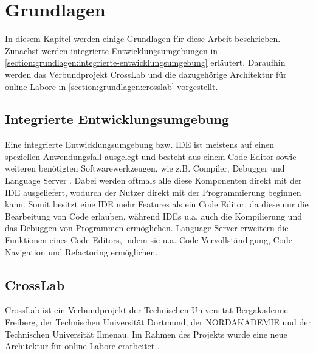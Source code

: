\chapter{Grundlagen}\label{section:grundlagen}

In diesem Kapitel werden einige Grundlagen für diese Arbeit beschrieben. Zunächst werden integrierte Entwicklungsumgebungen in \autoref{section:grundlagen:integrierte-entwicklungsumgebung} erläutert. Daraufhin werden das Verbundprojekt CrossLab und die dazugehörige Architektur für online Labore in \autoref{section:grundlagen:crosslab} vorgestellt.

\section{Integrierte Entwicklungsumgebung}\label{section:grundlagen:integrierte-entwicklungsumgebung}
Eine integrierte Entwicklungsumgebung bzw. \ac{IDE} ist meistens auf einen speziellen Anwendungsfall ausgelegt und besteht aus einem Code Editor sowie weiteren benötigten Softwarewerkzeugen, wie z.B. Compiler, Debugger und Language Server \cite{noauthor_language-server-protocol_nodate}. Dabei werden oftmals alle diese Komponenten direkt mit der \ac{IDE} ausgeliefert, wodurch der Nutzer direkt mit der Programmierung beginnen kann. Somit besitzt eine \ac{IDE} mehr Features als ein Code Editor, da diese nur die Bearbeitung von Code erlauben, während \acp{IDE} u.a. auch die Kompilierung und das Debuggen von Programmen ermöglichen. Language Server erweitern die Funktionen eines Code Editors, indem sie u.a. Code-Vervollständigung, Code-Navigation und Refactoring ermöglichen.

\section{CrossLab}\label{section:grundlagen:crosslab}
CrossLab \cite{aubel_adaptable_2022} ist ein Verbundprojekt der Technischen Universität Bergakademie Freiberg, der Technischen Universität Dortmund, der NORDAKADEMIE und der Technischen Universität Ilmenau. Im Rahmen des Projekts wurde eine neue Architektur für online Labore erarbeitet \cite{nau_new_2022}.

